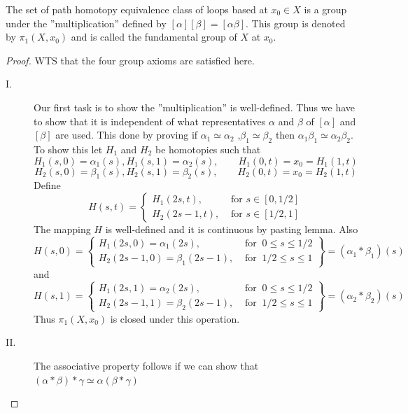 \begin{theorem}
The set of path homotopy equivalence class of loops based at $x_0\in X$ is a group under the ''multiplication'' defined by $[\alpha][\beta]=[\alpha\beta]$. This group is denoted by $\pi_1(X,x_0)$ and is called the fundamental group of $X$ at $x_0$.
\end{theorem}
\begin{proof}
WTS that the four group axioms are satisfied here.
\begin{description}
  \item[I.] Our first task is to show the ''multiplication'' is well-defined. Thus we have to show that it is independent of what representatives $\alpha$ and $\beta$ of $[\alpha]$ and $[\beta]$ are used. This done by proving if $\alpha_1\simeq \alpha_2$ ,$\beta_1\simeq\beta_2$ then $\alpha_1\beta_1\simeq\alpha_2\beta_2$. To show this let $H_1$ and $H_2$ be homotopies such that
      $$ H_1(s,0)=\alpha_1(s), H_1(s,1)=\alpha_2(s), \qquad H_1(0,t)=x_0=H_1(1,t)$$
      $$ H_2(s,0)=\beta_1(s), H_2(s,1)=\beta_2(s), \qquad H_2(0,t)=x_0=H_2(1,t)$$
  Define
$$
H(s,t)=
\begin{cases}
H_1(2s,t),&\mbox{ for }s\in[0,1/2]\\
H_2(2s-1,t),&\mbox{ for }s\in[1/2,1]
\end{cases}
$$
The mapping $H$ is well-defined and it is continuous by pasting lemma. Also
\[
    H(s,0) = \left\{\begin{array}{lr}
        H_1(2s,0)=\alpha_1(2s), & \text{ for }\ 0\leq s\leq 1/2\\
        H_2(2s-1,0)=\beta_1(2s-1), & \text{ for }\ 1/2\leq s\leq 1
        \end{array}\right\} = (\alpha_1\ast\beta_1)(s)
\]
and
\[
    H(s,1) = \left\{\begin{array}{lr}
        H_1(2s,1)=\alpha_2(2s), & \text{ for }\ 0\leq s\leq 1/2\\
        H_2(2s-1,1)=\beta_2(2s-1), & \text{ for }\ 1/2\leq s\leq 1
        \end{array}\right\} = (\alpha_2\ast\beta_2)(s)
\]
Thus $\pi_1(X,x_0)$ is closed under this operation.
  \item[II.] The associative property follows if we can show that $(\alpha \ast \beta)\ast\gamma \simeq\alpha(\beta\ast\gamma)$


\end{description}
\end{proof}
